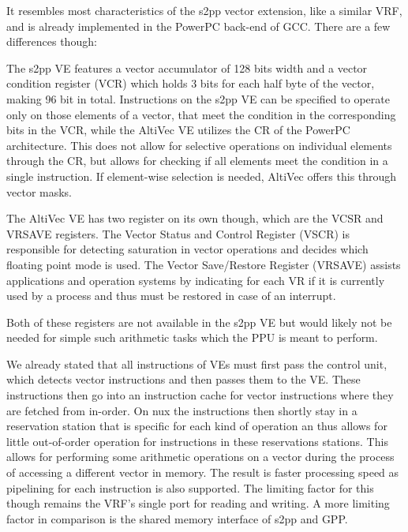 It resembles most characteristics of the s2pp vector extension, like a similar VRF, and is already implemented in the PowerPC back-end of GCC.
There are a few differences though:
\begin{addmargin}[2em]{0em}
    The s2pp VE features a vector accumulator of 128 bits width and a vector condition register (VCR) which holds 3 bits for each half byte of the vector, making 96 bit in total.
    Instructions on the s2pp VE can be specified to operate only on those elements of a vector, that meet the condition in the corresponding bits in the VCR, while the AltiVec VE utilizes the CR of the PowerPC architecture.
    This does not allow for selective operations on individual elements through the CR, but allows for checking if all elements meet the condition in a single instruction.
    If element-wise selection is needed, AltiVec offers this through vector masks.
    
    The AltiVec VE has two register on its own though, which are the VCSR and VRSAVE registers.
            The Vector Status and Control Register (VSCR) is responsible for detecting saturation in vector operations and decides which floating point mode is used.
            The Vector Save/Restore Register (VRSAVE) assists applications and operation systems by indicating for each VR if it is currently used by a process and thus must be restored in case of an interrupt.
    
    Both of these registers are not available in the s2pp VE but would likely not be needed for simple such arithmetic tasks which the PPU is meant to perform.
\end{addmargin}

We already stated that all instructions of VEs must first pass the control unit, which detects vector instructions and then passes them to the VE.
These instructions then go into an instruction cache for vector instructions where they are fetched from in-order.
On nux the instructions then shortly stay in a reservation station that is specific for each kind of operation an thus allows for little out-of-order operation for instructions in these reservations stations.
This allows for performing some arithmetic operations on a vector during the process of accessing a different vector in memory.
The result is faster processing speed as pipelining for each instruction is also supported.
The limiting factor for this though remains the VRF's single port for reading and writing.
A more limiting factor in comparison is the shared memory interface of s2pp and GPP.

